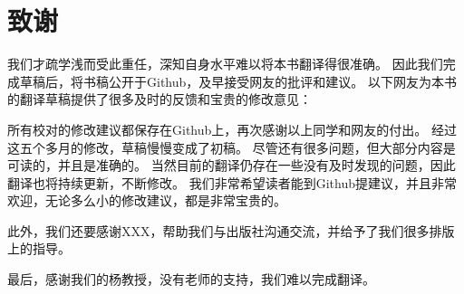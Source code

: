 \chapter*{致谢}

 我们才疏学浅而受此重任，深知自身水平难以将本书翻译得很准确。
因此我们完成草稿后，将书稿公开于Github，及早接受网友的批评和建议。
以下网友为本书的翻译草稿提供了很多及时的反馈和宝贵的修改意见：

 
所有校对的修改建议都保存在Github上，再次感谢以上同学和网友的付出。
经过这五个多月的修改，草稿慢慢变成了初稿。
尽管还有很多问题，但大部分内容是可读的，并且是准确的。
当然目前的翻译仍存在一些没有及时发现的问题，因此翻译也将持续更新，不断修改。
我们非常希望读者能到Github提建议，并且非常欢迎，无论多么小的修改建议，都是非常宝贵的。

此外，我们还要感谢XXX，帮助我们与出版社沟通交流，并给予了我们很多排版上的指导。

最后，感谢我们的杨教授，没有老师的支持，我们难以完成翻译。




